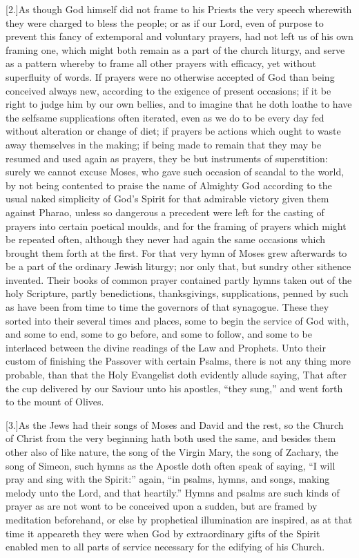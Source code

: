 [2.]As though God himself did not frame to his Priests the very speech wherewith they were charged to bless the people; or as if our Lord, even of purpose to prevent this fancy of extemporal and voluntary prayers, had not left us of his own framing one, which might both remain as a part of the church liturgy, and serve as a pattern whereby to frame all other prayers with efficacy, yet without superfluity of words. If prayers were no otherwise accepted of God than being conceived always new, according to the exigence of present occasions; if it be right to judge him by our own bellies, and to imagine that he doth loathe to have the selfsame supplications often iterated, even as we do to be every day fed without alteration or change of diet; if prayers be actions which ought to waste away themselves in the making; if being made to remain that they may be resumed and used again as prayers, they be but instruments of superstition: surely we cannot excuse Moses, who gave such occasion of scandal to the world, by not being contented to praise the name of Almighty God according to the usual naked simplicity of God’s Spirit for that admirable victory given them against Pharao, unless so dangerous a precedent were left for the casting of prayers into certain poetical moulds, and for the framing of prayers which might be repeated often, although they never had again the same occasions which brought them forth at the first. For that very hymn of Moses grew afterwards to be a part of the ordinary Jewish liturgy; nor only that, but sundry other sithence invented.  Their books of common prayer contained partly hymns taken out of the holy Scripture, partly benedictions,
 thanksgivings, supplications, penned by such as have been from time to time the governors of that synagogue. These they sorted into their several times and places, some to begin the service of God with, and some to end, some to go before, and some to follow, and some to be interlaced between the divine readings of the Law and Prophets. Unto their custom of finishing the Passover with certain Psalms, there is not any thing more probable, than that the Holy Evangelist doth evidently allude saying, That after the cup delivered by our Saviour unto his apostles, “they sung,” and went forth to the mount of Olives.

[3.]As the Jews had their songs of Moses and David and the rest, so the Church of Christ from the very beginning hath both used the same, and besides them other also of like nature, the song of the Virgin Mary, the song of Zachary,  the song of Simeon, such hymns as the Apostle doth often speak of saying,
 “I will pray and sing with the Spirit:” again, “in psalms, hymns, and songs, making melody unto the Lord, and that heartily.” Hymns and psalms are such kinds of prayer as are not wont to be conceived upon a sudden, but are framed by meditation beforehand, or else by prophetical illumination are inspired, as at that time it appeareth they were when God by extraordinary gifts of the Spirit enabled men to all parts of service necessary for the edifying of his Church.


